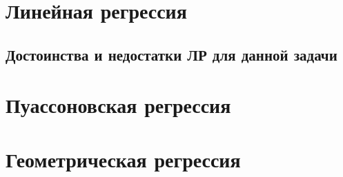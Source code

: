 \section{Линейная регрессия}
\subsection{Достоинства и недостатки ЛР для данной задачи}

\section{Пуассоновская регрессия}

\section{Геометрическая регрессия}